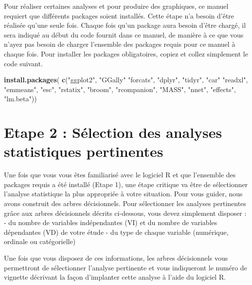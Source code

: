 \documentclass[
]{book}
\newenvironment{Shaded}{\begin{snugshade}}{\end{snugshade}}
\newcommand{\KeywordTok}[1]{\textcolor[rgb]{0.13,0.29,0.53}{\textbf{#1}}}
\newcommand{\NormalTok}[1]{#1}
\newcommand{\StringTok}[1]{\textcolor[rgb]{0.31,0.60,0.02}{#1}}
\begin{document}
Pour réaliser certaines analyses et pour produire des graphiques, ce manuel requiert que différents packages soient installés. Cette étape n'a besoin d'être réalisée qu'une seule fois. Chaque fois qu'un package aura besoin d'être chargé, il sera indiqué au début du code fournit dans ce manuel, de manière à ce que vous n'ayez pas besoin de charger l'ensemble des packages requis pour ce manuel à chaque fois.
Pour installer les packages obligatoires, copiez et collez simplement le code suivant.

\begin{Shaded}
\begin{Highlighting}[]
\KeywordTok{install.packages}\NormalTok{(}
  \KeywordTok{c}\NormalTok{(}\StringTok{"ggplot2"}\NormalTok{, }
    \StringTok{"GGally"}
    \StringTok{"forcats"}\NormalTok{, }
    \StringTok{"dplyr"}\NormalTok{, }
    \StringTok{"tidyr"}\NormalTok{, }
    \StringTok{"car"} 
    \StringTok{"readxl"}\NormalTok{,  }
    \StringTok{"emmeans"}\NormalTok{, }
    \StringTok{"esc"}\NormalTok{, }
    \StringTok{"rstatix"}\NormalTok{, }
    \StringTok{"broom"}\NormalTok{, }
    \StringTok{"rcompanion"}\NormalTok{,}
    \StringTok{"MASS"}\NormalTok{,}
    \StringTok{"nnet"}\NormalTok{,}
    \StringTok{"effects"}\NormalTok{, }
    \StringTok{"lm.beta"}\NormalTok{))}
\end{Highlighting}
\end{Shaded}

\hypertarget{etape-2-suxe9lection-des-analyses-statistiques-pertinentes}{%
\section{Etape 2 : Sélection des analyses statistiques pertinentes}\label{etape-2-suxe9lection-des-analyses-statistiques-pertinentes}}

Une fois que vous vous êtes familiarisé avec le logiciel R et que l'ensemble des packages requis a été installé (Etape 1), une étape critique va être de sélectionner l'analyse statistique la plus appropriée à votre situation. Pour vous guider, nous avons construit des arbres décisionnels. Pour sélectionner les analyses pertinentes grâce aux arbres décisionnels décrits ci-dessous, vous devez simplement disposer :
- du nombre de variables indépendantes (VI) et du nombre de variables dépendantes (VD) de votre étude
- du type de chaque variable (numérique, ordinale ou catégorielle)

Une fois que vous disposez de ces informations, les arbres décisionnels vous permettront de sélectionner l'analyse pertinente et vous indiqueront le numéro de vignette décrivant la façon d'implanter cette analyse à l'aide du logiciel R.
\end{document}
